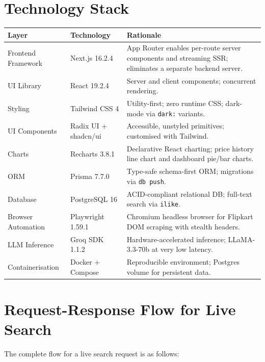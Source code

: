 \documentclass[12pt,a4paper]{report}
\begin{document}
\section{Technology Stack}

\begin{longtable}{L{3.5cm} L{2.5cm} L{7cm}}
  \toprule
  \textbf{Layer} & \textbf{Technology} & \textbf{Rationale} \\
  \midrule
  \endhead
  Frontend Framework & Next.js 16.2.4 &
    App Router enables per-route server components and streaming SSR;
    eliminates a separate backend server. \\[3pt]
  UI Library & React 19.2.4 &
    Server and client components; concurrent rendering. \\[3pt]
  Styling & Tailwind CSS 4 &
    Utility-first; zero runtime CSS; dark-mode via \texttt{dark:} variants. \\[3pt]
  UI Components & Radix UI + shadcn/ui &
    Accessible, unstyled primitives; customised with Tailwind. \\[3pt]
  Charts & Recharts 3.8.1 &
    Declarative React charting; price history line chart and
    dashboard pie/bar charts. \\[3pt]
  ORM & Prisma 7.7.0 &
    Type-safe schema-first ORM; migrations via \texttt{db push}. \\[3pt]
  Database & PostgreSQL 16 &
    ACID-compliant relational DB; full-text search via \texttt{ilike}. \\[3pt]
  Browser Automation & Playwright 1.59.1 &
    Chromium headless browser for Flipkart DOM scraping with stealth headers. \\[3pt]
  LLM Inference & Groq SDK 1.1.2 &
    Hardware-accelerated inference; LLaMA-3.3-70b at very low latency. \\[3pt]
  Containerisation & Docker + Compose &
    Reproducible environment; Postgres volume for persistent data. \\
  \bottomrule
\end{longtable}

\section{Request-Response Flow for Live Search}
The complete flow for a live search request is as follows:
\end{document}
